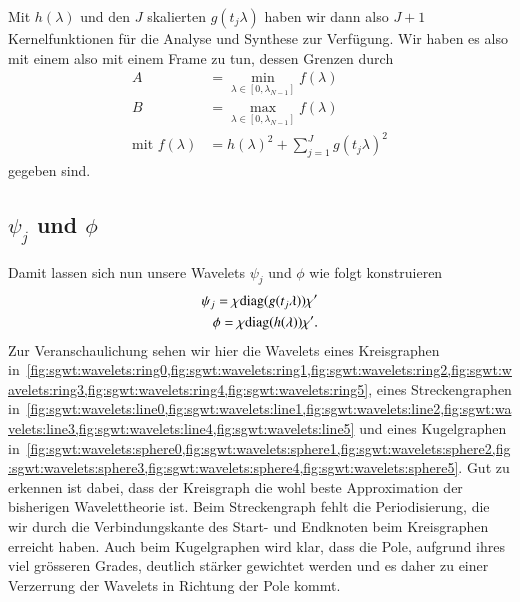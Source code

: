 Mit $h(\lambda)$ und den $J$ skalierten $g(t_j\lambda)$ haben wir dann 
also $J + 1$ Kernelfunktionen f\"ur die Analyse und Synthese zur Verf\"ugung. 
Wir haben es also mit einem also mit einem Frame zu tun, dessen Grenzen durch
\begin{align*}
A &= \min_{\lambda \in \left[0, \lambda_{N-1}\right]} f(\lambda) \\
B &= \max_{\lambda \in \left[0, \lambda_{N-1}\right]} f(\lambda) \\
\text{mit } f(\lambda) &= h(\lambda)^2 + \sum_{j = 1}^{J} g(t_j\lambda)^2
\end{align*}
gegeben sind.

\subsection{\texorpdfstring{$\psi_j$}{psi} und \texorpdfstring{$\phi$}{phi}}
Damit lassen sich nun unsere Wavelets $\psi_j$ und $\phi$ wie folgt konstruieren
\begin{align}
\psi_j = \chi \diag{g(t_j\lambda)} \chi' 
\label{eq:sgwt:psi}
\\
\phi = \chi \diag{h(\lambda)} \chi'.
\label{eq:sgwt:phi}
\end{align}
Zur Veranschaulichung sehen wir hier die Wavelets eines Kreisgraphen 
in~\cref{fig:sgwt:wavelets:ring0,fig:sgwt:wavelets:ring1,fig:sgwt:wavelets:ring2,fig:sgwt:wavelets:ring3,fig:sgwt:wavelets:ring4,fig:sgwt:wavelets:ring5},
 eines Streckengraphen 
in~\cref{fig:sgwt:wavelets:line0,fig:sgwt:wavelets:line1,fig:sgwt:wavelets:line2,fig:sgwt:wavelets:line3,fig:sgwt:wavelets:line4,fig:sgwt:wavelets:line5}
 und eines Kugelgraphen 
in~\cref{fig:sgwt:wavelets:sphere0,fig:sgwt:wavelets:sphere1,fig:sgwt:wavelets:sphere2,fig:sgwt:wavelets:sphere3,fig:sgwt:wavelets:sphere4,fig:sgwt:wavelets:sphere5}.
Gut zu erkennen ist dabei, dass der Kreisgraph die wohl beste Approximation der 
bisherigen Wavelettheorie ist. Beim Streckengraph fehlt die Periodisierung, die 
wir durch die Verbindungskante des Start- und Endknoten beim Kreisgraphen 
erreicht haben. Auch beim Kugelgraphen wird klar, dass die Pole, aufgrund ihres 
viel gr\"osseren Grades, deutlich st\"arker gewichtet werden und es daher zu 
einer Verzerrung der Wavelets in Richtung der Pole kommt.

